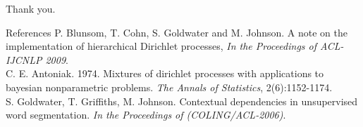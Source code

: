 \documentclass{beamer}
\begin{document}
\begin{frame}
    \begin{center}
        \Large Thank you.
    \end{center}

\begin{block}{References}
    \footnotesize
    \vspace{0.5cm}
    P. Blunsom, T. Cohn, S. Goldwater and M. Johnson. A note on the
    implementation of hierarchical Dirichlet processes,
    {\em In the Proceedings of ACL-IJCNLP 2009}. \\
    \vspace{0.5cm}
    C. E. Antoniak. 1974. Mixtures of dirichlet processes with 
    applications to bayesian nonparametric problems. 
    {\em The Annals of Statistics}, 2(6):1152-1174.  \\
    \vspace{0.5cm}
    S. Goldwater, T. Griffiths, M. Johnson. 
    Contextual dependencies in unsupervised word segmentation. 
    {\em In the Proceedings of (COLING/ACL-2006)}. 
    \vspace{0.5cm}
\end{block}
\end{frame} 
\end{document}
